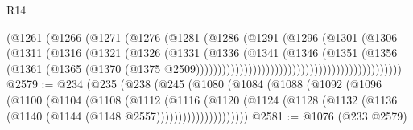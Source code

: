 \begin{lexlean}{R14}
\begin{coremodule}
{{{{{{{{{{{{{{{{{{{{{{{{{{{{{{{{{{{{{{{{{{{{{{{{{{{{{{{{{{{{{{{{{{{{{{{{{{{{{{{{{{{{{{{{{{{{{{{{{{{{{{{{{{                                                  (@1261
                                                    (@1266
                                                      (@1271
                                                        (@1276
                                                          (@1281
                                                            (@1286
                                                              (@1291
                                                                (@1296
                                                                  (@1301
                                                                    (@1306
                                                                      (@1311
                                                                        (@1316
                                                                          (@1321
                                                                            (@1326
                                                                              (@1331
                                                                                (@1336
                                                                                  (@1341
                                                                                    (@1346
                                                                                      (@1351
                                                                                        (@1356
                                                                                          (@1361
                                                                                            (@1365
                                                                                              (@1370
                                                                                                (@1375
                                                                                                  @2509)))))))))))))))))))))))))))))))))))))))))))))))
@2579 := @234
    (@235
      (@238
        (@245
          (@1080
            (@1084
              (@1088
                (@1092
                  (@1096
                    (@1100
                      (@1104
                        (@1108
                          (@1112
                            (@1116
                              (@1120
                                (@1124
                                  (@1128
                                    (@1132 (@1136 (@1140 (@1144 (@1148 @2557)))))))))))))))))))))
@2581 := @1076 (@233 @2579)
}}}}}}}}}}}}}}}}}}}}}}}}}}}}}}}}}}}}}}}}}}}}}}}}}}}}}}}}}}}}}}}}}}}}}}}}}}}}}}}}}}}}}}}}}}}}}}}}}}}}}}}}}}
\end{coremodule}
\end{lexlean}
